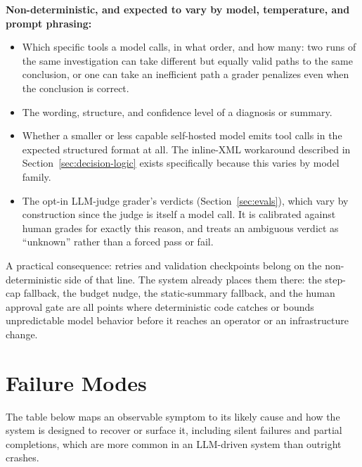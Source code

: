 \documentclass[11pt]{article}
\begin{document}
\textbf{Non-deterministic, and expected to vary by model, temperature, and
prompt phrasing:}
\begin{itemize}
  \item Which specific tools a model calls, in what order, and how many:
    two runs of the same investigation can take different but equally valid
    paths to the same conclusion, or one can take an inefficient path a
    grader penalizes even when the conclusion is correct.
  \item The wording, structure, and confidence level of a diagnosis or
    summary.
  \item Whether a smaller or less capable self-hosted model emits tool calls
    in the expected structured format at all. The inline-XML workaround
    described in Section~\ref{sec:decision-logic} exists specifically
    because this varies by model family.
  \item The opt-in LLM-judge grader's verdicts (Section~\ref{sec:evals}),
    which vary by construction since the judge is itself a model call. It is
    calibrated against human grades for exactly this reason, and treats an
    ambiguous verdict as ``unknown'' rather than a forced pass or fail.
\end{itemize}

A practical consequence: retries and validation checkpoints belong on the
non-deterministic side of that line. The system already places them there:
the step-cap fallback, the budget nudge, the static-summary fallback, and
the human approval gate are all points where deterministic code catches or
bounds unpredictable model behavior before it reaches an operator or an
infrastructure change.

\section{Failure Modes}

The table below maps an observable symptom to its likely cause and how the
system is designed to recover or surface it, including silent failures and
partial completions, which are more common in an LLM-driven system than
outright crashes.
\end{document}
